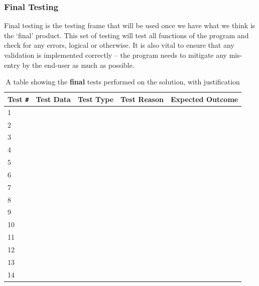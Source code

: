 \documentclass[9pt]{article}
\begin{document}
\subsubsection{Final Testing}
Final testing is the testing frame that will be used once we have what we think is the `final' product. This set of testing will test all functions of the program and check for any errors, logical or otherwise. It is also vital to ensure that any validation is implemented correctly -- the program needs to mitigate any mis-entry by the end-user as much as possible.
\begin{table}[H]
	\centering
	\begin{tabularx}{\textwidth}{lXlXX}
		\textbf{Test} \verb|#| & \textbf{Test Data}            & \textbf{Test Type} & \textbf{Test Reason}           & \textbf{Expected Outcome}      \\ \midrule
		1   &  &  &  & \\
		2   &  &  &  & \\
		3   &  &  &  & \\
		4   &  &  &  & \\
		5   &  &  &  & \\
		6   &  &  &  & \\
		7   &  &  &  & \\
		8   &  &  &  & \\
		9   &  &  &  & \\
		10  &  &  &  & \\
		11  &  &  &  & \\
		12  &  &  &  & \\
		13  &  &  &  & \\
		14  &  &  &  & \\ \bottomrule
	\end{tabularx}
	\caption{A table showing the \textbf{final} tests performed on the solution, with justification}
	\label{tab_testingDesignSolutionFinal}
\end{table}
\newpage
\end{document}
